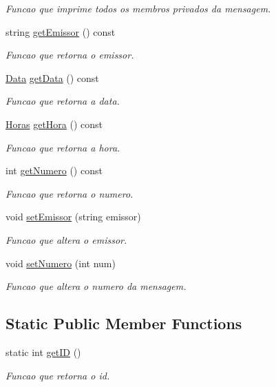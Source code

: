 \begin{DoxyCompactItemize}
\begin{DoxyCompactList}\small\item\em Funcao que imprime todos os membros privados da mensagem. \end{DoxyCompactList}\item 
string \hyperlink{class_mensagem_a5438dfe93aec2e6512042704e134d5db}{get\+Emissor} () const 
\begin{DoxyCompactList}\small\item\em Funcao que retorna o emissor. \end{DoxyCompactList}\item 
\hyperlink{class_data}{Data} \hyperlink{class_mensagem_a8d3b52e1c20fac96c4df60c79b5b7846}{get\+Data} () const 
\begin{DoxyCompactList}\small\item\em Funcao que retorna a data. \end{DoxyCompactList}\item 
\hyperlink{class_horas}{Horas} \hyperlink{class_mensagem_a7285a85c11aea596e25c6f87a68ad86f}{get\+Hora} () const 
\begin{DoxyCompactList}\small\item\em Funcao que retorna a hora. \end{DoxyCompactList}\item 
int \hyperlink{class_mensagem_a376309b58e69c41bf10acb7adad7bd3d}{get\+Numero} () const 
\begin{DoxyCompactList}\small\item\em Funcao que retorna o numero. \end{DoxyCompactList}\item 
void \hyperlink{class_mensagem_a74d42818d3796b28496f400e02328c92}{set\+Emissor} (string emissor)
\begin{DoxyCompactList}\small\item\em Funcao que altera o emissor. \end{DoxyCompactList}\item 
void \hyperlink{class_mensagem_a042a57d4dca817ed0450340b42111a9a}{set\+Numero} (int num)
\begin{DoxyCompactList}\small\item\em Funcao que altera o numero da mensagem. \end{DoxyCompactList}\end{DoxyCompactItemize}
\subsection*{Static Public Member Functions}
\begin{DoxyCompactItemize}
\item 
static int \hyperlink{class_mensagem_aedda3752e5473856e88644839a16fb10}{get\+I\+D} ()
\begin{DoxyCompactList}\small\item\em Funcao que retorna o id. \end{DoxyCompactList}\end{DoxyCompactItemize}


